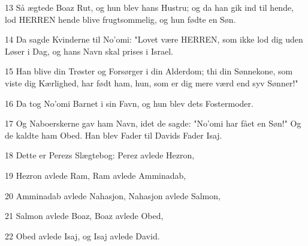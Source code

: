\par 13 Så ægtede Boaz Rut, og hun blev hans Hustru; og da han gik ind til hende, lod HERREN hende blive frugtsommelig, og hun fødte en Søn.
\par 14 Da sagde Kvinderne til No'omi: "Lovet være HERREN, som ikke lod dig uden Løser i Dag, og hans Navn skal prises i Israel.
\par 15 Han blive din Trøster og Forsørger i din Alderdom; thi din Sønnekone, som viste dig Kærlighed, har født ham, hun, som er dig mere værd end syv Sønner!"
\par 16 Da tog No'omi Barnet i sin Favn, og hun blev dets Fostermoder.
\par 17 Og Naboerskerne gav ham Navn, idet de sagde: "No'omi har fået en Søn!" Og de kaldte ham Obed. Han blev Fader til Davids Fader Isaj.
\par 18 Dette er Perezs Slægtebog: Perez avlede Hezron,
\par 19 Hezron avlede Ram, Ram avlede Amminadab,
\par 20 Amminadab avlede Nahasjon, Nahasjon avlede Salmon,
\par 21 Salmon avlede Boaz, Boaz avlede Obed,
\par 22 Obed avlede Isaj, og Isaj avlede David.


